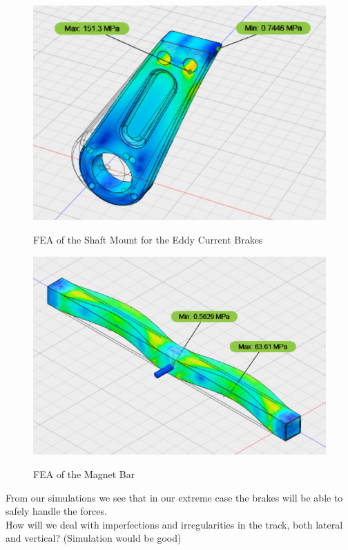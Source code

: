 \documentclass[main.tex]{subfiles}
\begin{document}
    \begin{figure}[H]
    	\centering
        \includegraphics[width = \linewidth]{images/ShaftMount}
        \label{fig:ShafttMount}
        \caption{FEA of the Shaft Mount for the Eddy Current Brakes}
    \end{figure}
    \begin{figure}[H]
    	\centering
        \includegraphics[width=\linewidth]{images/MagnetBarFEA}
        \label{fig:MagnetBar}
        \caption{FEA of the Magnet Bar}
    \end{figure}
    From our simulations we see that in our extreme case the brakes will be able to safely handle the forces.\\
    How will we deal with imperfections and irregularities in the track, both lateral and vertical? (Simulation would be good)
\end{document}
